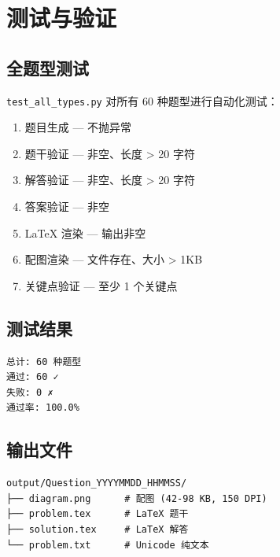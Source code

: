 \documentclass[11pt,a4paper]{article}
\begin{document}
\section{测试与验证}

\subsection{全题型测试}

\texttt{test\_all\_types.py} 对所有 60 种题型进行自动化测试：

\begin{enumerate}
    \item 题目生成 — 不抛异常
    \item 题干验证 — 非空、长度 > 20 字符
    \item 解答验证 — 非空、长度 > 20 字符
    \item 答案验证 — 非空
    \item LaTeX 渲染 — 输出非空
    \item 配图渲染 — 文件存在、大小 > 1KB
    \item 关键点验证 — 至少 1 个关键点
\end{enumerate}

\subsection{测试结果}

\begin{verbatim}
总计: 60 种题型
通过: 60 ✓
失败: 0 ✗
通过率: 100.0%
\end{verbatim}

\subsection{输出文件}

\begin{verbatim}
output/Question_YYYYMMDD_HHMMSS/
├── diagram.png      # 配图 (42-98 KB, 150 DPI)
├── problem.tex      # LaTeX 题干
├── solution.tex     # LaTeX 解答
└── problem.txt      # Unicode 纯文本
\end{verbatim}
\end{document}
